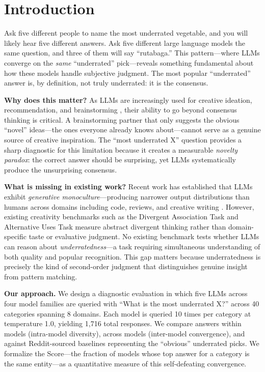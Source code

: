 \section{Introduction}
\label{sec:intro}

Ask five different people to name the most underrated vegetable, and you will likely hear five different answers. Ask five different large language models the same question, and three of them will say ``rutabaga.'' This pattern---where LLMs converge on the \textit{same} ``underrated'' pick---reveals something fundamental about how these models handle subjective judgment. The most popular ``underrated'' answer is, by definition, not truly underrated: it is the consensus.

{\bf Why does this matter?} As LLMs are increasingly used for creative ideation, recommendation, and brainstorming \citep{anderson2024homogenization, padmakumar2024diversity}, their ability to go beyond consensus thinking is critical. A brainstorming partner that only suggests the obvious ``novel'' ideas---the ones everyone already knows about---cannot serve as a genuine source of creative inspiration. The ``most underrated X'' question provides a sharp diagnostic for this limitation because it creates a measurable \textit{novelty paradox}: the correct answer should be surprising, yet LLMs systematically produce the unsurprising consensus.

{\bf What is missing in existing work?} Recent work has established that LLMs exhibit \textit{generative monoculture}---producing narrower output distributions than humans across domains including code, reviews, and creative writing \citep{wu2024monoculture, wenger2025homogeneity}. However, existing creativity benchmarks such as the Divergent Association Task and Alternative Uses Task \citep{divergent2024creativity, liveideabench2024} measure abstract divergent thinking rather than domain-specific taste or evaluative judgment. No existing benchmark tests whether LLMs can reason about \textit{underratedness}---a task requiring simultaneous understanding of both quality and popular recognition. This gap matters because underratedness is precisely the kind of second-order judgment that distinguishes genuine insight from pattern matching.

{\bf Our approach.} We design a diagnostic evaluation in which five LLMs across four model families are queried with ``What is the most underrated X?'' across 40 categories spanning 8 domains. Each model is queried 10 times per category at temperature 1.0, yielding 1,716 total responses. We compare answers within models (intra-model diversity), across models (inter-model convergence), and against Reddit-sourced baselines representing the ``obvious'' underrated picks. We formalize the \noveltyparadox Score---the fraction of models whose top answer for a category is the same entity---as a quantitative measure of this self-defeating convergence.

